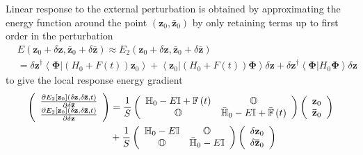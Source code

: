 \documentclass[aps,preprint]{revtex4}%
\begin{document}
Linear response to the external perturbation is obtained by approximating the
energy function around the point $\left(  \mathbf{z}{_{0},\mathbf{\bar{z}}%
_{0}}\right)  $ by only retaining terms up to first order in the perturbation
\begin{align}
&  E\left(  \mathbf{z}{_{0}+\delta\mathbf{z},\mathbf{\bar{z}}_{0}%
+\delta\mathbf{\bar{z}}}\right)  \approx E_{2}\left(  \mathbf{z}{_{0}%
+\delta\mathbf{z},\mathbf{\bar{z}}_{0}+\delta\mathbf{\bar{z}}}\right)
\nonumber\\
&  ={\delta\mathbf{z}}^{\dagger}\left\langle \left.  \mathbf{\Phi}\right\vert
\left(  H_{0}+F\left(  t\right)  \right)  \mathbf{z}{_{0}}\right\rangle
+\left\langle \left.  \mathbf{z}{_{0}}\right\vert \left(  H_{0}+F\left(
t\right)  \right)  \mathbf{\Phi}\right\rangle {\delta\mathbf{z+}%
\delta\mathbf{z}}^{\dagger}\left\langle \left.  \mathbf{\Phi}\right\vert
H_{0}\mathbf{\Phi}\right\rangle {\delta\mathbf{z}}%
\end{align}
to give the local response energy gradient
\begin{align}
\left(
\begin{array}
[c]{c}%
\frac{\partial E_{2}\left[  \mathbf{z}_{0}\right]  \left(  \delta
\mathbf{z},\delta\mathbf{\bar{z}},t\right)  }{\partial\delta\mathbf{\bar{z}}%
}\\
\frac{\partial E_{2}\left[  \mathbf{z}_{0}\right]  \left(  \delta
\mathbf{z},\delta\mathbf{\bar{z}},t\right)  }{\partial\delta\mathbf{z}}%
\end{array}
\right)   &  =\frac{1}{S}\left(
\begin{array}
[c]{cc}%
\mathbb{H}_{0}-E\mathbb{I+F}\left(  t\right)  & \mathbb{O}\\
\mathbb{O} & \mathbb{\bar{H}}_{0}-E\mathbb{I+\bar{F}}\left(  t\right)
\end{array}
\right)  \left(
\begin{array}
[c]{c}%
\mathbf{z}{_{0}}\\
\mathbf{\bar{z}}{_{0}}%
\end{array}
\right) \nonumber\\
&  +\frac{1}{S}\left(
\begin{array}
[c]{cc}%
\mathbb{H}_{0}-E\mathbb{I} & \mathbb{O}\\
\mathbb{O} & \mathbb{\bar{H}}_{0}-E\mathbb{I}%
\end{array}
\right)  \left(
\begin{array}
[c]{c}%
\delta\mathbf{z}{_{0}}\\
\delta\mathbf{\bar{z}}{_{0}}%
\end{array}
\right)
\end{align}
\end{document}
